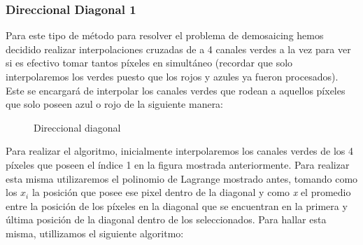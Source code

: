\documentclass[10pt, a4paper]{article}
\begin{document}
\hspace{5cm}

\subsubsection{Direccional Diagonal 1}

Para este tipo de m\'etodo para resolver el problema de demosaicing hemos decidido realizar interpolaciones cruzadas de a 4 canales verdes a la vez para ver si es efectivo tomar tantos p\'ixeles en simult\'aneo (recordar que solo interpolaremos los verdes puesto que los rojos y azules ya fueron procesados). Este se encargar\'a de interpolar los canales verdes que rodean a aquellos p\'ixeles que solo poseen azul o rojo de la siguiente manera:

\begin{figure}[H]
\centering
	\caption{Direccional diagonal} 
\end{figure}

Para realizar el algoritmo, inicialmente interpolaremos los canales verdes de los 4 p\'ixeles que poseen el \'indice 1 en la figura mostrada anteriormente. Para realizar esta misma utilizaremos el polinomio de Lagrange mostrado antes, tomando como los $x_{i}$ la posici\'on que posee ese pixel dentro de la diagonal y como \textit{x} el promedio entre la posici\'on de los p\'ixeles en la diagonal que se encuentran en la primera y \'ultima posici\'on de la diagonal dentro de los seleccionados. Para hallar esta misma, utillizamos el siguiente algoritmo:
\end{document}
